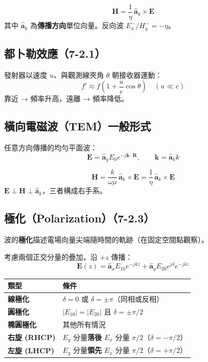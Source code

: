 \documentclass[12pt,a4paper]{article}
\newcommand{\vE}{\mathbf{E}}
\newcommand{\vH}{\mathbf{H}}
\newcommand{\vk}{\mathbf{k}}
\newcommand{\ax}{\hat{\mathbf{a}}_x}
\newcommand{\ay}{\hat{\mathbf{a}}_y}
\newcommand{\ak}{\hat{\mathbf{a}}_k}
\begin{document}
\begin{tipbox}[由 $\vE$ 快速求 $\vH$]
\[
\vH = \frac{1}{\eta}\,\ak\times\vE
\]
其中 $\ak$ 為\textbf{傳播方向}單位向量。反向波 $E_x^-/H_y^- = -\eta$。
\end{tipbox}

\subsection{都卜勒效應（7-2.1）}

發射器以速度 $u$、與觀測線夾角 $\theta$ 朝接收器運動：
\[
f' \approx f\left(1 + \frac{u}{c}\cos\theta\right) \quad (u \ll c)
\]
靠近 → 頻率升高，遠離 → 頻率降低。

\subsection{橫向電磁波（TEM）一般形式}

任意方向傳播的均勻平面波：
\[
\vE = \ay E_0 e^{-j\vk\cdot\mathbf{R}}, \qquad \vk = \ak k
\]

\begin{keybox}[一般 TEM 關係]
\[
\vH = \frac{k}{\omega\mu}\,\ak\times\vE = \frac{1}{\eta}\,\ak\times\vE
\]
$\vE \perp \vH \perp \ak$，三者構成右手系。
\end{keybox}

\subsection{極化（Polarization）（7-2.3）}

\begin{notebox}[極化的定義]
波的\textbf{極化}描述電場向量尖端隨時間的軌跡（在固定空間點觀察）。
\end{notebox}

考慮兩個正交分量的疊加，沿 $+z$ 傳播：
\[
\vE(z) = \ax E_{10} e^{-jkz} + \ay E_{20} e^{j\delta} e^{-jkz}
\]

\begin{keybox}[極化判定速查表]
\renewcommand{\arraystretch}{1.6}
\begin{center}
\begin{tabular}{>{\bfseries}l l}
\toprule
類型 & 條件 \\
\midrule
線極化 & $\delta = 0$ 或 $\delta = \pm\pi$（同相或反相） \\
圓極化 & $|E_{10}|=|E_{20}|$ 且 $\delta = \pm\pi/2$ \\
橢圓極化 & 其他所有情況 \\
\midrule
右旋 (RHCP) & $E_y$ 分量\textbf{落後} $E_x$ 分量 $\pi/2$（$\delta=-\pi/2$） \\
左旋 (LHCP) & $E_y$ 分量\textbf{領先} $E_x$ 分量 $\pi/2$（$\delta=+\pi/2$） \\
\bottomrule
\end{tabular}
\end{center}
\end{keybox}
\end{document}
